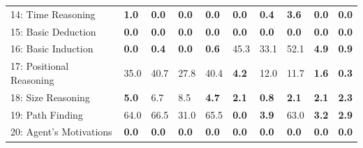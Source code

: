 \documentclass[ko,indentfirst,twoside,ms]{snuthesis_utf8}
\begin{document}
\begin{table}[h]
\begin{adjustbox}{max width=0.95\textwidth}
\begin{tabular}{l|llllllll>{\columncolor[gray]{0.8}}l}
14: Time Reasoning                   & \textbf{1.0}                       &\textbf{0.0}                        & \textbf{0.0}                         &\textbf {0.0}                     & \textbf{0.0}                      & \textbf{0.4} & \textbf{3.6}                      &\textbf{0.0}                    & \textbf{0.0}                    \\
15: Basic Deduction                  & \textbf{0.0}                       & \textbf{0.0}                        &\textbf{0.0}                         & \textbf{0.0}                    &\textbf{0.0}                    & \textbf{0.0}                     &\textbf{0.0}                        & \textbf{0.0}                   &\textbf{0.0}                     \\
16: Basic Induction                  &\textbf{0.0}                       & \textbf{0.4}                        & \textbf{0.0}                         & \textbf{0.6}                   & 45.3                     & 33.1                    & 52.1                       & \textbf{4.9}                   & \textbf{0.9}                    \\
17: Positional Reasoning             & 35.0                        & 40.7                       & 27.8                        & 40.4                    & \textbf{4.2}                      & 12.0                    & 11.7                       & \textbf{1.6}                    & \textbf{0.3} \\
18: Size Reasoning                   & \textbf{5.0}                      & 6.7                        & 8.5                         & \textbf{4.7}                     & \textbf{2.1}                     & \textbf{0.8}                     & \textbf{2.1}                        & \textbf{2.1}                    & \textbf{2.3}                     \\
19: Path Finding                     & 64.0                      & 66.5                       & 31.0                        & 65.5                    & \textbf{0.0}                      & \textbf{3.9}                     & 63.0                       & \textbf{3.2}                    & \textbf{2.9}                     \\
20: Agent's Motivations              & \textbf{0.0}                       & \textbf{0.0}                        & \textbf{0.0} & \textbf{0.0}                    &\textbf{ 0.0}                      & \textbf{0.0}                     & \textbf{0.0}                        &\textbf{0.0}                    & \textbf{0.0}                     \\ \hline

\end{tabular}
\end{adjustbox}
\end{table}
\end{document}
